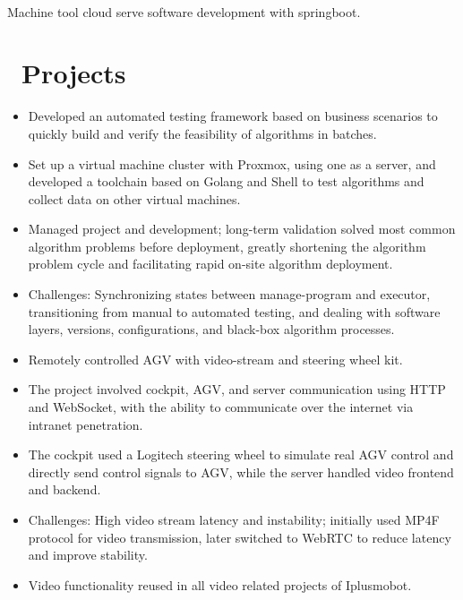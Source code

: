 \documentclass[a4paper,10pt]{resume}
\begin{document}
\\ Machine tool cloud serve software development with springboot.

\section{\faFile\ Projects}
\begin{itemize}[parsep=0.5ex]
  \item Developed an automated testing framework based on business scenarios to quickly build and verify the feasibility of algorithms in batches.
  \item Set up a virtual machine cluster with Proxmox, using one as a server, and developed a toolchain based on Golang and Shell to test algorithms and collect data on other virtual machines.
  \item Managed project and development; long-term validation solved most common algorithm problems before deployment, greatly shortening the algorithm problem cycle and facilitating rapid on-site algorithm deployment.
  \item Challenges: Synchronizing states between manage-program and executor, transitioning from manual to automated testing, and dealing with software layers, versions, configurations, and black-box algorithm processes.
\end{itemize}

\begin{itemize}[parsep=0.5ex]
  \item Remotely controlled AGV with video-stream and steering wheel kit.
  \item The project involved cockpit, AGV, and server communication using HTTP and WebSocket, with the ability to communicate over the internet via intranet penetration.
  \item The cockpit used a Logitech steering wheel to simulate real AGV control and directly send control signals to AGV, while the server handled video frontend and backend.
  \item Challenges: High video stream latency and instability; initially used MP4F protocol for video transmission, later switched to WebRTC to reduce latency and improve stability.
  \item Video functionality reused in all video related projects of Iplusmobot.
\end{itemize}
\end{document}
